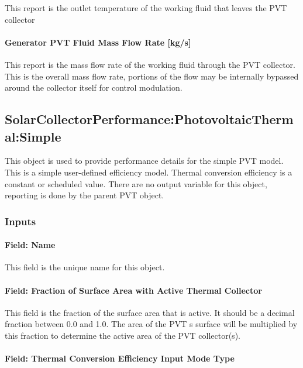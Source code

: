 This report is the outlet temperature of the working fluid that leaves the PVT collector

\paragraph{Generator PVT Fluid Mass Flow Rate {[}kg/s{]}}\label{generator-pvt-fluid-mass-flow-rate-kgs}

This report is the mass flow rate of the working fluid through the PVT collector. This is the overall mass flow rate, portions of the flow may be internally bypassed around the collector itself for control modulation.

\subsection{SolarCollectorPerformance:PhotovoltaicThermal:Simple}\label{solarcollectorperformancephotovoltaicthermalsimple}

This object is used to provide performance details for the simple PVT model. This is a simple user-defined efficiency model. Thermal conversion efficiency is a constant or scheduled value. There are no output variable for this object, reporting is done by the parent PVT object.

\subsubsection{Inputs}\label{inputs-5-029}

\paragraph{Field: Name}\label{field-name-5-023}

This field is the unique name for this object.

\paragraph{Field: Fraction of Surface Area with Active Thermal Collector}\label{field-fraction-of-surface-area-with-active-thermal-collector}

This field is the fraction of the surface area that is active. It should be a decimal fraction between 0.0 and 1.0. The area of the PVT s surface will be multiplied by this fraction to determine the active area of the PVT collector(s).

\paragraph{Field: Thermal Conversion Efficiency Input Mode Type}\label{field-thermal-conversion-efficiency-input-mode-type}

